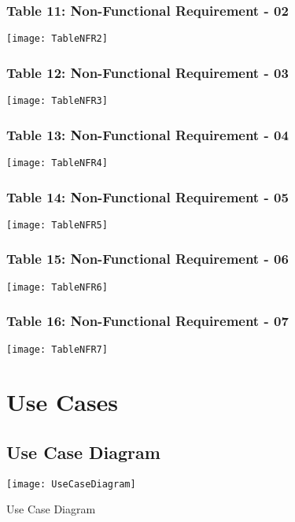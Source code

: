 \begin{figure}[ht]
\subsubsection{Table 11: Non-Functional Requirement - 02}
\centering
\texttt{[image: TableNFR2]}
\end{figure}

\begin{figure}[ht]
\subsubsection{Table 12: Non-Functional Requirement - 03}
\centering
\texttt{[image: TableNFR3]}
\end{figure}

\begin{figure}[ht]
\subsubsection{Table 13: Non-Functional Requirement - 04}
\centering
\texttt{[image: TableNFR4]}
\end{figure}

\begin{figure}[ht]
\subsubsection{Table 14: Non-Functional Requirement - 05}
\centering
\texttt{[image: TableNFR5]}
\end{figure}

\begin{figure}[ht]
\subsubsection{Table 15: Non-Functional Requirement - 06}
\centering
\texttt{[image: TableNFR6]}
\end{figure}

\begin{figure}[ht]
\subsubsection{Table 16: Non-Functional Requirement - 07}
\centering
\texttt{[image: TableNFR7]}
\end{figure}
\begin{figure}
\section{Use Cases}
\subsection{Use Case Diagram}
\center
\texttt{[image: UseCaseDiagram]}
\caption{Use Case Diagram}
\label{fig:UseCaseDiagram}
\end{figure}

